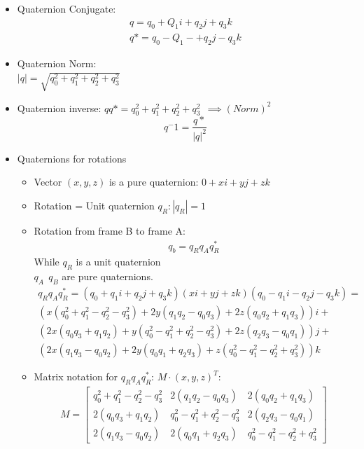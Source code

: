 \documentclass{article}
\begin{document}
\begin{itemize}
    \item Quaternion Conjugate: \\
    \begin{gather*}
        q=q_0+Q_1i+q_2j+q_3k\\
        q*=q_0-Q_1-+q_2j-q_3k
    \end{gather*}
    \item Quaternion Norm: \\
    $ \left|q\right|=\sqrt{q^2_0+q^2_1+q^2_2+q^2_3} $
    \item Quaternion inverse:
    $ qq* = q^2_0+q^2_1+q^2_2+q^2_3 \:\: \implies (Norm)^2$
    $$q^-1 = \frac{q*}{|q|^2} $$
    \item Quaternions for rotations
    \begin{itemize}
        \item Vector $(x,y,z)$ is a pure quaternion: $0+xi+yj+zk $
        \item Rotation = Unit quaternion $q_R:|q_R|=1$
        \item Rotation from frame B to frame A:
        \begin{gather*}
         q_b = q_Rq_Aq^*_R
        \end{gather*}
        While $q_R$ is a unit quaternion\\
        $q_A \:\: q_B$ are pure quaternions.
        \begin{gather*}
            q_Rq_Aq^*_R = (q_0 + q_1i + q_2j + q_3k)(xi + yj + zk)(q_0 - q_1i - q_2j - q_3k) = \\
            (x(q^2_0 + q^2_1 - q^2_2 - q^2_3) + 2y(q_1q_2-q_0q_3)+2z(q_0q_2+q_1q_3))i + \\
            (2x(q_0q_3 + q_1q_2)+y(q^2_0 - q^2_1 + q^2_2 - q^2_3) + 2z(q_2q_3-q_0q_1))j + \\
            (2x(q_1q_3-q_0q_2)+2y(q_0q_1+q_2q_3)+z(q^2_0 - q^2_1 - q^2_2 + q^2_3))k
        \end{gather*}
        \item Matrix notation for $q_Rq_Aq^*_R$: $M\cdot(x,y,z)^T$:
        \begin{gather*}
            M =
          \begin{bmatrix}
            q^2_0 + q^2_1 - q^2_2 - q^2_3 & 2(q_1q_2-q_0q_3) & 2(q_0q_2+q_1q_3) \\
            2(q_0q_3 + q_1q_2) & q^2_0 - q^2_1 + q^2_2 - q^2_3 & 2(q_2q_3-q_0q_1)  \\
            2(q_1q_3-q_0q_2) & 2(q_0q_1+q_2q_3) & q^2_0 - q^2_1 - q^2_2 + q^2_3
          \end{bmatrix}

\end{gather*}
\end{itemize}
\end{itemize}
\end{document}
